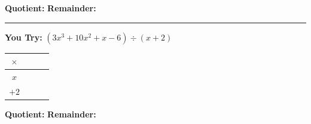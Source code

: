 \documentclass[14pt]{extarticle}
\begin{document}
\vspace{0.1cm}
\textbf{Quotient:} \underline{\hspace{2in}} \hfill \textbf{Remainder:} \underline{\hspace{1.2in}}

\vspace{0.25cm}
\hrule
\vspace{0.3cm}

\textbf{You Try:} \quad $(3x^3 + 10x^2 + x - 6) \div (x + 2)$

\vspace{0.2cm}
\begin{center}
\renewcommand{\arraystretch}{2.5}
\large
\begin{tabular}{|c||p{0.8in}|p{0.8in}|p{0.8in}|}
\hline
$\times$ & & & \\
\hline\hline
$x$ & & & \\
\hline
$+2$ & & & \\
\hline
\end{tabular}
\end{center}

\vspace{0.1cm}
\textbf{Quotient:} \underline{\hspace{2in}} \hfill \textbf{Remainder:} \underline{\hspace{1.2in}}
\end{document}
